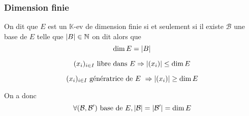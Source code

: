 \documentclass[11pt,colorlinks]{book}
\theoremstyle{mytheoremstyle}
\theoremstyle{mytheoremstyle}
\theoremstyle{mytheoremstyle}
\theoremstyle{mytheoremstyle}
\theoremstyle{mytheoremstyle}
\theoremstyle{mytheoremstyle}
\theoremstyle{mytheoremstyle}
\theoremstyle{mytheoremstyle}
\theoremstyle{myproblemstyle}
\def\mbb#1{\mathbb{#1}}
\def\bN{\mbb{N}}
\def\bK{\mbb{K}}
\begin{document}
\subsubsection{Dimension finie}
\begin{definition}
  On dit que $E$ est un $\bK$-ev de dimension finie si et seulement si il existe $\mathcal B$ une base de $E$ telle que $\abs{B} \in \bN$ 
  on dit alors que 
  \begin{equation*}
    \dim E = \abs{B}
  \end{equation*}
\end{definition}
\begin{prop}
  \begin{equation*}
    (x_i)_{i \in I} \text{ libre dans } E \Rightarrow \abs{(x_i)} \leq \dim E
  \end{equation*} 
\end{prop}
\begin{prop}
  \begin{equation*}
    (x_i)_{i \in I} \text { génératrice de } E \Rightarrow \abs{(x_i)} \geq \dim E
  \end{equation*}
\end{prop}
\begin{theorem}
  On a donc 
  \begin{equation*}
    \forall (\mathcal B,\mathcal B') \text{ base de } E, \abs{\mathcal B} = \abs{\mathcal B'} = \dim E
  \end{equation*}
\end{theorem}
\end{document}
